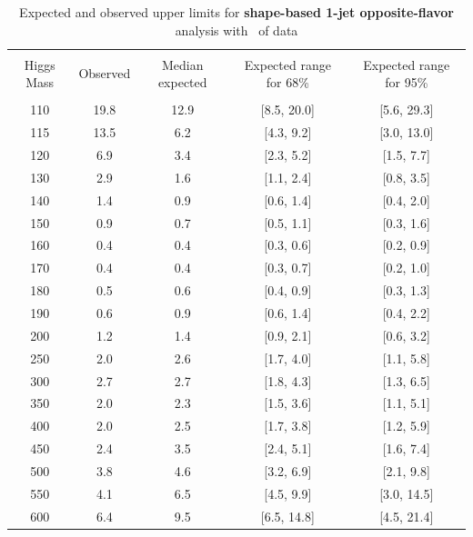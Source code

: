 \begin{table}[!hbp]
\begin{center}
\begin{tabular}{c c c c c}
\hline
\vspace{-3mm} && \\
 Higgs Mass   & Observed & Median expected & Expected range for 68\% & Expected range for 95\%   \\
\vspace{-3mm} && \\
\hline
110 & 19.8 & 12.9 & [8.5, 20.0] & [5.6, 29.3] \\
115 & 13.5 & 6.2 & [4.3, 9.2] & [3.0, 13.0] \\
120 & 6.9 & 3.4 & [2.3, 5.2] & [1.5, 7.7] \\
130 & 2.9 & 1.6 & [1.1, 2.4] & [0.8, 3.5] \\
140 & 1.4 & 0.9 & [0.6, 1.4] & [0.4, 2.0] \\
150 & 0.9 & 0.7 & [0.5, 1.1] & [0.3, 1.6] \\
160 & 0.4 & 0.4 & [0.3, 0.6] & [0.2, 0.9] \\
170 & 0.4 & 0.4 & [0.3, 0.7] & [0.2, 1.0] \\
180 & 0.5 & 0.6 & [0.4, 0.9] & [0.3, 1.3] \\
190 & 0.6 & 0.9 & [0.6, 1.4] & [0.4, 2.2] \\
200 & 1.2 & 1.4 & [0.9, 2.1] & [0.6, 3.2] \\
250 & 2.0 & 2.6 & [1.7, 4.0] & [1.1, 5.8] \\
300 & 2.7 & 2.7 & [1.8, 4.3] & [1.3, 6.5] \\
350 & 2.0 & 2.3 & [1.5, 3.6] & [1.1, 5.1] \\
400 & 2.0 & 2.5 & [1.7, 3.8] & [1.2, 5.9] \\
450 & 2.4 & 3.5 & [2.4, 5.1] & [1.6, 7.4] \\
500 & 3.8 & 4.6 & [3.2, 6.9] & [2.1, 9.8] \\
550 & 4.1 & 6.5 & [4.5, 9.9] & [3.0, 14.5] \\
600 & 6.4 & 9.5 & [6.5, 14.8] & [4.5, 21.4] \\
\hline
\end{tabular}
\caption{Expected and observed upper limits for {\bf shape-based 1-jet
    opposite-flavor} analysis with \intlumi\ of data}
\label{tab:of0_cut}
\end{center}
\end{table}
